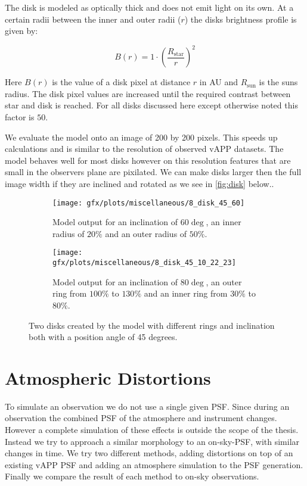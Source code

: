 The disk is modeled as optically thick and does not emit light on its own. At a certain radii between the inner and outer radii ($r$) the disks brightness profile is given by:

\begin{equation}
B(r) = 1 \cdot {\left(\frac{R_{\text{star}}}{r}\right)}^2
\end{equation}

Here $B(r)$ is the value of a disk pixel at distance $r$ in AU and $R_\text{sun}$ is the suns radius. The disk pixel values are increased until the required contrast between star and disk is reached. For all disks discussed here except otherwise noted this factor is $50$.

We evaluate the model onto an image of 200 by 200 pixels. This speeds up calculations and is similar to the resolution of observed \ac{vAPP} datasets. The model behaves well for most disks however on this resolution features that are small in the observers plane are pixilated. We can make disks larger then the full image width if they are inclined and rotated as we see in \autoref{fig:disk} below..

\begin{figure}[h!]
  \begin{subfigure}[t]{0.5\textwidth}
    \texttt{[image: gfx/plots/miscellaneous/8\_disk\_45\_60]}
    \caption{Model output for an inclination of $60\deg$, an inner radius of $20\%$ and an outer radius of $50\%$.}
  \end{subfigure}
  \begin{subfigure}[t]{0.5\textwidth}
    \texttt{[image: gfx/plots/miscellaneous/8\_disk\_45\_10\_22\_23]}
    \caption{Model output for an inclination of $80\deg$, an outer ring from $100\%$ to $130\%$ and an inner ring from $30\%$ to $80\%$.}
  \end{subfigure}
  \caption{Two disks created by the model with different rings and inclination both with a position angle of 45 degrees.}
  \label{fig:disk}
\end{figure}





\section{Atmospheric Distortions}

To simulate an observation we do not use a single given \ac{PSF}. Since during an observation the combined \ac{PSF}  of the atmosphere and instrument changes. However a complete simulation of these effects is outside the scope of the thesis. Instead we try to approach a similar morphology to an on-sky-\ac{PSF}, with similar changes in time. We try two different methods, adding distortions on top of an existing \ac{vAPP} \ac{PSF} and adding an atmosphere simulation to the PSF generation. Finally we compare the result of each method to on-sky observations.

